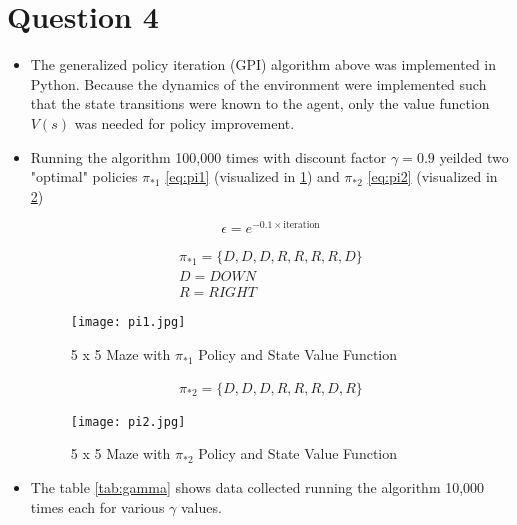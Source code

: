 \documentclass[letterpaper]{article} %
\begin{document}
\section{Question 4}
	\begin{itemize}
	    \item The generalized policy iteration (GPI) algorithm above was implemented in Python. Because the dynamics of the environment were implemented such that the state transitions were known to the agent, only the value function $V(s)$ was needed for policy improvement.
	    \item Running the algorithm 100,000 times with discount factor $\gamma=0.9$ yeilded two "optimal" policies $\pi_{*1}$ \ref{eq:pi1} (visualized in \ref{fig:pi1}) and $\pi_{*2}$ \ref{eq:pi2} (visualized in \ref{fig:pi2})

	    \begin{equation}
		\label{eq:eps_decay}
		\epsilon = e^{-0.1 \times \text{iteration}}
	    \end{equation}

	    \begin{gather}
		\pi_{*1} = \{D,D,D,R,R,R,R,D\} \\
		D = DOWN \\
		R = RIGHT
	    \label{eq:pi1}
	    \end{gather}

	    \begin{figure}[htbp]
	      \centering
	      \texttt{[image: pi1.jpg]}
		\caption{5 x 5 Maze with $\pi_{*1}$ Policy and State Value Function}
	      \label{fig:pi1}
	    \end{figure}

	    \begin{gather}
		\pi_{*2} = \{D,D,D,R,R,R,D,R\}
	    \label{eq:pi2}
	    \end{gather}

	    \begin{figure}[htbp]
	      \centering
	      \texttt{[image: pi2.jpg]}
		\caption{5 x 5 Maze with $\pi_{*2}$ Policy and State Value Function}
	      \label{fig:pi2}
	    \end{figure}

	    \item The table \ref{tab:gamma} shows data collected running the algorithm 10,000 times each for various $\gamma$ values.


\end{itemize}
\end{document}
